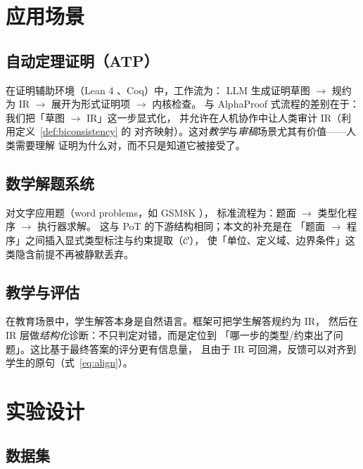 \documentclass[UTF8,a4paper,11pt]{ctexart}
\begin{document}
\section{应用场景}\label{sec:application}

\subsection{自动定理证明（ATP）}

在证明辅助环境（Lean 4 \citep{demoura2021lean4}、Coq）中，工作流为：
LLM 生成证明草图 $\to$ 规约为 IR $\to$ 展开为形式证明项 $\to$ 内核检查。
与 AlphaProof 式流程的差别在于：我们把「草图 $\to$ IR」这一步显式化，
并允许在人机协作中让人类审计 IR（利用定义~\ref{def:biconsistency} 的
对齐映射）。这对\emph{教学}与\emph{审稿}场景尤其有价值——人类需要理解
证明为什么对，而不只是知道它被接受了。

\subsection{数学解题系统}

对文字应用题（word problems，如 GSM8K \citep{cobbe2021gsm8k}），
标准流程为：题面 $\to$ 类型化程序 $\to$ 执行器求解。
这与 PoT \citep{chen2023pot} 的下游结构相同；本文的补充是在
「题面 $\to$ 程序」之间插入显式类型标注与约束提取（$\mathcal{C}$），
使「单位、定义域、边界条件」这类隐含前提不再被静默丢弃。

\subsection{教学与评估}

在教育场景中，学生解答本身是自然语言。框架可把学生解答规约为 IR，
然后在 IR 层做\emph{结构化}诊断：不只判定对错，而是定位到
「哪一步的类型/约束出了问题」。这比基于最终答案的评分更有信息量，
且由于 IR 可回溯，反馈可以对齐到学生的原句（式~\eqref{eq:align}）。

\section{实验设计}\label{sec:experiment}

\subsection{数据集}
\end{document}
